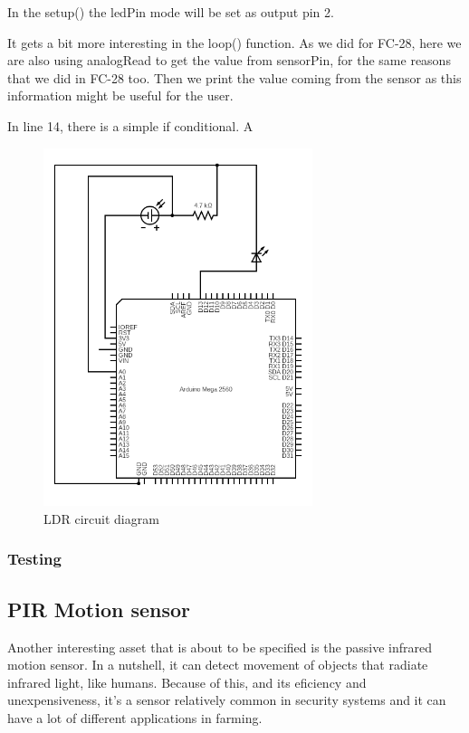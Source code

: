 In the setup() the ledPin mode will be set as output pin 2.

It gets a bit more interesting in the loop() function. As we did for FC-28, here we are also using analogRead to get the value from sensorPin, for the same reasons that we did in FC-28 too. Then we print the value coming from the sensor as this information might be useful for the user.

In line 14, there is a simple if conditional. A
\begin{figure}[H]
    \centering
    \includegraphics[width=0.7\textwidth]{fig/ldr-scheme-circuit.png}
    \caption{LDR circuit diagram}
    \label{fig:ldr}
\end{figure}


\subsubsection{Testing}

\subsection{PIR Motion sensor}
Another interesting asset that is about to be specified is the passive infrared motion sensor\cite{pir-guide}. In a nutshell, it can detect movement of objects that radiate infrared light, like humans. Because of this, and its eficiency and unexpensiveness, it's a sensor relatively common in security systems and it can have a lot of different applications in farming.

